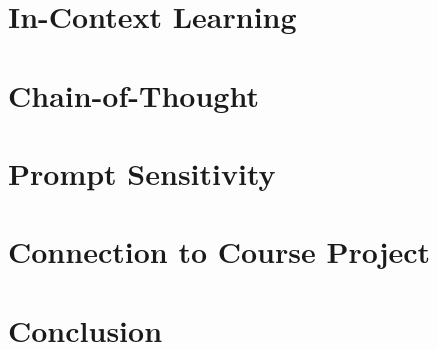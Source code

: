 \documentclass[letter,10pt]{article}
\begin{document}

\newpage
\section*{In-Context Learning}

\section*{Chain-of-Thought}

\section*{Prompt Sensitivity}

\section*{Connection to Course Project}

\section*{Conclusion}

\newpage


\newpage

\end{document}
